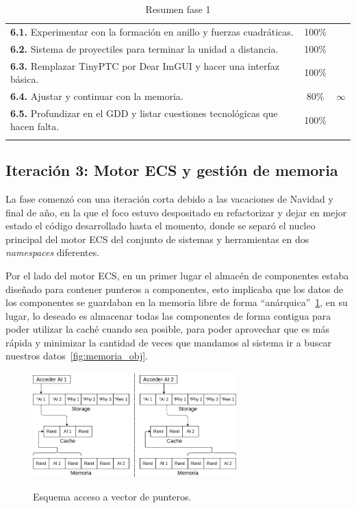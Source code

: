\begin{longtable}[c]{|p{7cm}|c|c|}
	\cmidrule[1pt]{1-3}

\textbf{6.1.} Experimentar con la formación en anillo
				y fuerzas cuadráticas.                     & 100\% &   \\
	\cmidrule[.003pt]{1-3}
\textbf{6.2.} Sistema de proyectiles para terminar la
				unidad a distancia.                        & 100\% &   \\
	\cmidrule[.003pt]{1-3}
\textbf{6.3.} Remplazar  TinyPTC por Dear ImGUI y
				hacer una interfaz básica.                 & 100\% &   \\
	\cmidrule[.003pt]{1-3}
\textbf{6.4.} Ajustar y continuar con la memoria.          & 80\%  & $\infty$ \\
	\cmidrule[.003pt]{1-3}
\textbf{6.5.} Profundizar en el GDD y listar cuestiones
				tecnológicas que hacen falta.              & 100\% &   \\
\hline
\caption{Resumen fase 1}
\end{longtable}

\subsection*{Iteración 3: Motor ECS y gestión de memoria}
La fase comenzó con una iteración corta debido a las vacaciones de Navidad y final de año, en la
que el foco estuvo despositado en refactorizar y dejar en mejor estado el código desarrollado
hasta el momento, donde se separó el nucleo principal del motor \ac{ECS} del conjunto de sistemas y
herramientas en dos \textit{namespaces} diferentes. 

Por el lado del motor \ac{ECS}, en un primer lugar el almacén de componentes estaba diseñado
para contener punteros a componentes, esto implicaba que los datos de los componentes se
guardaban en la memoria libre de forma ``anárquica''~\ref{fig:memoria_ptr}, 
en su lugar, lo deseado es almacenar todas las componentes de forma contigua para poder utilizar
la caché cuando sea posible, para poder aprovechar que es más rápida y minimizar la cantidad de
veces que mandamos al sistema ir a buscar nuestros datos~\ref{fig:memoria_obj}.

\begin{figure}[htb]
\centering
\includegraphics[width=0.7\textwidth]{imagenes/diario_desarrollo/memoria2.png}\\
\caption{Esquema acceso a vector de punteros.}
\label{fig:memoria_ptr}
\end{figure}

